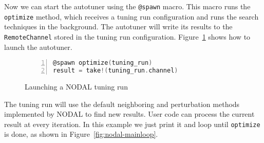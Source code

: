Now we can start the autotuner using the \texttt{@spawn} macro. This macro runs
the \texttt{optimize} method, which receives a tuning run configuration and
runs the search techniques in the background. The autotuner will write its
results to the \texttt{RemoteChannel} stored in the tuning run configuration.
Figure~\ref{fig:nodal-launching} shows how to launch the autotuner.

\begin{figure}[htpb]
    \begin{minipage}{\linewidth}
    \begin{lstlisting}[language=C, basicstyle=\ttfamily\scriptsize,
        numbers=left,
        frame=no, showspaces=false, showstringspaces=false,
        numberstyle=\scriptsize,
        xleftmargin=1.5cm,
        keywords={%
            @spawnat, remotecall, Nullable, Any,
            @fetch, Future, Array, Float64, julia,
            @spawn,
            while, true, function, end, put!,
            take!, sleep, RemoteChannel, Channel,
            Int, Tuple, const, addprocs, @schedule,
            @everywhere, for, in, myid, @async,
            remote_do, workers, Result, Real,
            AbstractFloat, deepcopy, rand, exp, true,
            Function, false, Run, mutable, struct,
            begin, Configuration, Dict, Symbol, using, import,
            FloatParameter, @spawn,
            ResultChannel, AbstractChannel, return%
        },
        otherkeywords={::, \&, \*, +, -, /, [, ], >, <, put!, take!, neighbor!,
                       update!}
    ]
@spawn optimize(tuning_run)
result = take!(tuning_run.channel)
    \end{lstlisting}
    \end{minipage}
    \caption{Launching a NODAL tuning run}
    \label{fig:nodal-launching}
\end{figure}

The tuning run will use the default neighboring and perturbation methods
implemented by NODAL to find new results. User code can process the
current result at every iteration. In this example we just
print it and loop until \texttt{optimize} is done, as shown in
Figure~\ref{fig:nodal-mainloop}.

